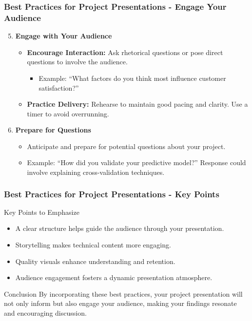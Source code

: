 \documentclass[aspectratio=169]{beamer}
\begin{document}
\begin{frame}[fragile]
  \frametitle{Best Practices for Project Presentations - Engage Your Audience}
  \begin{enumerate}
    \setcounter{enumi}{4}
    \item \textbf{Engage with Your Audience}
      \begin{itemize}
        \item \textbf{Encourage Interaction:} Ask rhetorical questions or pose direct questions to involve the audience.
          \begin{itemize}
            \item Example: ``What factors do you think most influence customer satisfaction?''
          \end{itemize}
        \item \textbf{Practice Delivery:} Rehearse to maintain good pacing and clarity. Use a timer to avoid overrunning.
      \end{itemize}
      
    \item \textbf{Prepare for Questions}
      \begin{itemize}
        \item Anticipate and prepare for potential questions about your project.
        \item Example: ``How did you validate your predictive model?'' Response could involve explaining cross-validation techniques.
      \end{itemize}
  \end{enumerate}
\end{frame}

\begin{frame}[fragile]
  \frametitle{Best Practices for Project Presentations - Key Points}
  \begin{block}{Key Points to Emphasize}
    \begin{itemize}
      \item A clear structure helps guide the audience through your presentation.
      \item Storytelling makes technical content more engaging.
      \item Quality visuals enhance understanding and retention.
      \item Audience engagement fosters a dynamic presentation atmosphere.
    \end{itemize}
  \end{block}
  \begin{block}{Conclusion}
    By incorporating these best practices, your project presentation will not only inform but also engage your audience, making your findings resonate and encouraging discussion.
  \end{block}
\end{frame}
\end{document}

